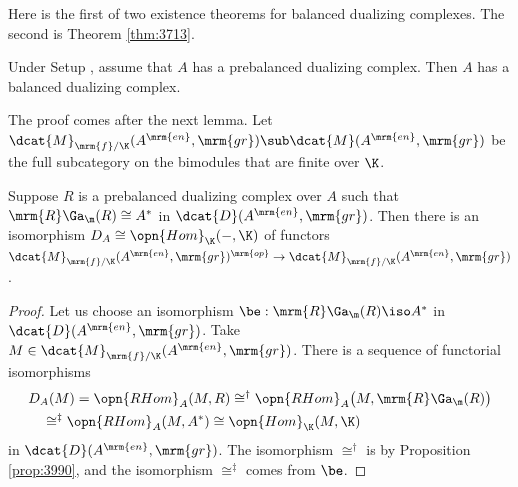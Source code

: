 Here is the first of two existence theorems for balanced dualizing complexes. 
The second is Theorem \ref{thm:3713}. 

\begin{thm} \label{thm:3781}
Under Setup \tup{\ref{setup:3925}}, assume that $A$ has a prebalanced 
dualizing complex. Then $A$ has a balanced dualizing complex.
\end{thm}

The proof comes after the next lemma. Let 
$\dcat{M}_{\mrm{f}/ \K}(A^{\mrm{en}}, \mrm{gr}) \sub 
\dcat{M}(A^{\mrm{en}}, \mrm{gr})$
be the full subcategory on the bimodules that are finite over $\K$.

\begin{lem} \label{lem:3925}
Suppose $R$ is a prebalanced dualizing complex over $A$ such that 
$\mrm{R} \Ga_{\m}(R) \cong A^*$ in 
$\dcat{D}(A^{\mrm{en}}, \mrm{gr})$. 
Then there is an isomorphism 
$D_A \cong \opn{Hom}_{\K}(-, \K)$
of functors 
$\dcat{M}_{\mrm{f}/ \K}(A^{\mrm{en}}, \mrm{gr})^{\mrm{op}} \to
\dcat{M}_{\mrm{f}/ \K}(A^{\mrm{en}}, \mrm{gr})$.
\end{lem}

\begin{proof}
Let us choose an isomorphism 
$\be : \mrm{R} \Ga_{\m}(R) \iso A^*$
in $\dcat{D}(A^{\mrm{en}}, \mrm{gr})$. 
Take $M \in \dcat{M}_{\mrm{f}/ \K}(A^{\mrm{en}}, \mrm{gr})$. 
There is a sequence of functorial isomorphisms 
\[ \begin{aligned}
& D_A(M) = \opn{RHom}_A(M, R)
\cong^{\dag} \opn{RHom}_A \bigl( M, \mrm{R} \Ga_{\m}(R) \bigr)
\\ & \quad 
\cong^{\ddag} \opn{RHom}_A(M, A^*) 
\cong \opn{Hom}_{\K}(M, \K) 
\end{aligned} \]
in $\dcat{D}(A^{\mrm{en}}, \mrm{gr})$. 
The isomorphism $\cong^{\dag}$ is by Proposition \ref{prop:3990}, and the 
isomorphism $\cong^{\ddag}$ comes from $\be$. 
\end{proof}

